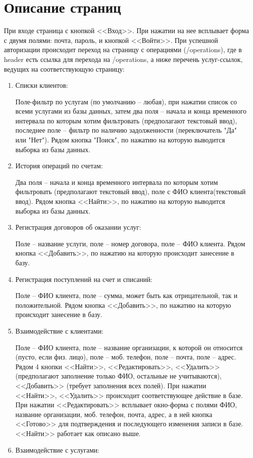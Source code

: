 \documentclass[oneside,senior,etd]{BYUPhysForDegree}
\begin{document}
\fixmargins
\makepreliminarypages
\oneandhalfspace

\newpage 
 
\newpage
\section{Описание страниц}

При входе страница с кнопкой <<Вход>>. При нажатии на нее всплывает форма с двумя полями: почта, пароль, и кнопкой <<Войти>>. При успешной авторизации происходит переход на страницу с операциями (/operations), где в header есть ссылка для перехода на /operations, а ниже перечень услуг-ссылок, ведущих на соответствующую страницу:
\begin{enumerate}
    \item Списки клиентов:
    
    Поле-фильтр по услугам (по умолчанию -- любая), при нажатии список со всеми услугами из базы данных, затем два поля -- начала и конца временного интервала по которым хотим фильтровать (предполагают текстовый ввод),  последнее поле -- фильтр по наличию задолженности (переключатель "Да" или "Нет"). Рядом кнопка "Поиск", по нажатию на которую выводится выборка из базы данных.
    \item История операций по счетам:
    
    Два поля -- начала и конца временного интервала по которым хотим фильтровать (предполагают текстовый ввод), поле с ФИО клиента(текстовый ввод). Рядом кнопка <<Найти>>, по нажатию на которую выводится выборка из базы данных.
    \item Регистрация договоров об оказании услуг:
    
    Поле -- название услуги, поле -- номер договора, поле -- ФИО клиента. Рядом кнопка <<Добавить>>, по нажатию на которую происходит занесение в базу.
    \item Регистрация поступлений на счет и списаний:
    
    Поле -- ФИО клиента, поле -- сумма, может быть как отрицательной, так и положительной. Рядом кнопка <<Добавить>>, по нажатию на которую происходит занесение в базу.
    \item Взаимодействие с клиентами:
    
    Поле -- ФИО клиента, поле -- название организации, к которой он относится (пусто, если физ. лицо), поле -- моб. телефон, поле -- почта, поле -- адрес. Рядом 4 кнопки <<Найти>>, <<Редактировать>>, <<Удалить>> (предполагают заполнение только ФИО, остальные не учитываются), <<Добавить>> (требует заполнения всех полей). При нажатии <<Найти>>, <<Удалить>> происходит соответствующее действие в базе. При нажатии <<Редактировать>> всплывает окно-форма с полями ФИО, название организации, моб. телефон, почта, адрес, а в ней кнопка <<Готово>> для подтверждения и последующего изменения записи в базе. <<Найти>> работает как описано выше.
    \item Взаимодействие с услугами:
    

\end{enumerate}
\end{document}
